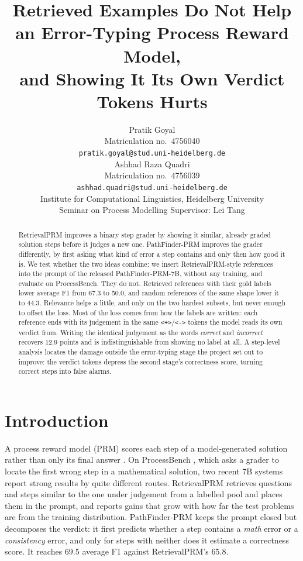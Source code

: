 \documentclass[11pt]{article}
\title{Retrieved Examples Do Not Help an Error-Typing Process Reward Model,\\
and Showing It Its Own Verdict Tokens Hurts}
\author{Pratik Goyal \\
  Matriculation no.\ 4756040 \\
  {\small\texttt{pratik.goyal@stud.uni-heidelberg.de}} \\\And
  Ashhad Raza Quadri \\
  Matriculation no.\ 4756039 \\
  {\small\texttt{ashhad.quadri@stud.uni-heidelberg.de}} \\\AND
  Institute for Computational Linguistics, Heidelberg University \\
  Seminar on Process Modelling \quad Supervisor: Lei Tang}
\newcommand{\pos}{\texttt{<+>}}
\newcommand{\negt}{\texttt{<->}}
\begin{document}
\maketitle

\begin{abstract}
RetrievalPRM improves a binary step grader by showing it similar, already graded solution
steps before it judges a new one. PathFinder-PRM improves the grader differently, by first
asking what kind of error a step contains and only then how good it is. We test whether the
two ideas combine: we insert RetrievalPRM-style references into the prompt of the released
PathFinder-PRM-7B, without any training, and evaluate on ProcessBench. They do not.
Retrieved references with their gold labels lower average F1 from 67.3 to 50.0, and random
references of the same shape lower it to 44.3. Relevance helps a little, and only on the two
hardest subsets, but never enough to offset the loss. Most of the loss comes from how the labels
are written: each reference ends with its judgement in the same \pos{}/\negt{} tokens the model
reads its own verdict from. Writing the identical judgement as the words \emph{correct} and
\emph{incorrect} recovers 12.9 points and is indistinguishable from showing no label at all. A
step-level analysis locates the damage outside the error-typing stage the project set out to
improve: the verdict tokens depress the second stage's correctness score, turning correct steps
into false alarms.
\end{abstract}

\section{Introduction}

A process reward model (PRM) scores each step of a model-generated solution rather than only
its final answer \citep{uesato2022solving,lightman2024verify}. On ProcessBench
\citep{zheng2024processbench}, which asks a grader to locate the first wrong step in a
mathematical solution, two recent 7B systems report strong results by quite different routes.
RetrievalPRM \citep{zhu2025retrievalprm} retrieves questions and steps similar to the one under
judgement from a labelled pool and places them in the prompt, and reports gains that grow with
how far the test problems are from the training distribution. PathFinder-PRM
\citep{pala2025pathfinder} keeps the prompt closed but decomposes the verdict: it first
predicts whether a step contains a \emph{math} error or a \emph{consistency} error, and only
for steps with neither does it estimate a correctness score. It reaches 69.5 average F1
against RetrievalPRM's 65.8.
\end{document}
